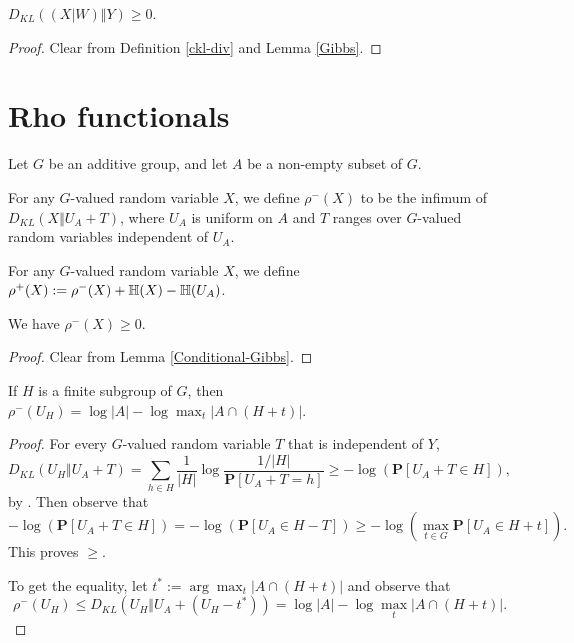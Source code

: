 \begin{lemma}\label{Conditional-Gibbs}\leanok  $D_{KL}((X|W)\Vert Y) \geq 0$.
\end{lemma}

\begin{proof}  Clear from Definition \ref{ckl-div} and Lemma \ref{Gibbs}.
\end{proof}

\section{Rho functionals}

Let $G$ be an additive group, and let $A$ be a non-empty subset of $G$.

\begin{definition}\label{rhominus-def}\leanok  For any $G$-valued random variable $X$, we define $\rho^-(X)$ to be the infimum of $D_{KL}(X \Vert  U_A + T)$, where $U_A$ is uniform on $A$ and $T$ ranges over $G$-valued random variables independent of $U_A$.
\end{definition}

\begin{definition}\label{rhoplus-def}\leanok  For any $G$-valued random variable $X$, we define $\rho^+(X) := \rho^-(X) + \mathbb{H}(X) - \mathbb{H}(U_A)$.
\end{definition}

\begin{lemma}\label{rhominus-nonneg}\label{rho_minus_nonneg}\leanok  We have $\rho^-(X) \geq 0$.
\end{lemma}

\begin{proof} Clear from Lemma \ref{Conditional-Gibbs}.
\end{proof}

\begin{lemma}\label{rhominus-subgroup}\leanok If $H$ is a finite subgroup of $G$, then $\rho^-(U_H) = \log |A| - \log \max_t |A \cap (H+t)|$.
\end{lemma}

\begin{proof}
  For every $G$-valued random variable $T$ that is independent of $Y$,
  $$D_{KL}(U_H \Vert U_A+T) = \sum_{h\in H} \frac{1}{|H|}\log\frac{1/|H|}{\mathbf{P}[U_A+T=h]}\ge -\log(\mathbf{P}[U_A+T\in H]),$$
  by . Then observe that $$-\log(\mathbf{P}[U_A+T\in H])=-\log(\mathbf{P}[U_A\in H-T])\ge -\log(\max_{t\in G} \mathbf{P}[U_A\in H+t]).$$ This proves $\ge$.

  To get the equality, let $t^*:=\arg\max_t |A \cap (H+t)|$ and observe that $$\rho^-(U_H)\le D_{KL}(U_H \Vert  U_A+(U_H-t^*))= \log |A| - \log \max_t|A \cap (H+t)|.$$
\end{proof}

